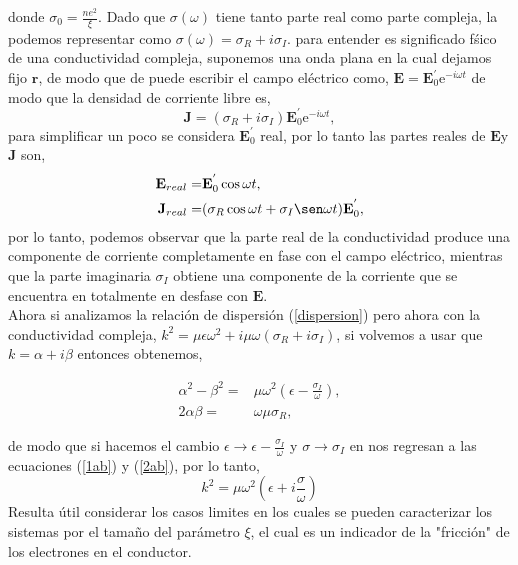 \documentclass[11pt,fleqn]{book} %
\begin{document}
   donde $\sigma_0=\frac{ne^2}{\xi}$. Dado que $\sigma(\omega)$ tiene tanto parte real como parte compleja, la podemos representar como $\sigma(\omega)=\sigma_R+i\sigma_I$. para entender es significado f\'sico de una conductividad compleja, suponemos una onda plana en la cual dejamos fijo $\textbf{r}$, de modo que de puede escribir el campo el\'ectrico como, $\textbf{E}=\textbf{E}_0^{'}\text{e}^{-i\omega t}$ de modo que la densidad de corriente libre es,
   \begin{equation*}
    \textbf{J}=(\sigma_R+i\sigma_I) \textbf{E}_0^{'}\text{e}^{-i\omega t},
    \end{equation*}
    para simplificar un poco se considera $\textbf{E}_0^{'}$ real, por lo tanto las partes reales de $\textbf{E}$y $\textbf{J}$ son,
    \begin{equation}  \label{desfase}
    \begin{split}
    \textbf{E}_{real}=&\textbf{E}_0^{'}\cos \omega t,\\
    \textbf{J}_{real}=&(\sigma_R\cos \omega t+\sigma_I\sen \omega t)\textbf{E}_0^{'},
    \end{split}
    \end{equation}
    por lo tanto, podemos observar que la parte real de la conductividad produce una componente de corriente completamente en fase con el campo el\'ectrico, mientras que la parte imaginaria $\sigma_I$ obtiene una componente de la corriente que se encuentra en totalmente en desfase con $\textbf{E}$.\\
 Ahora si analizamos la relaci\'on de dispersi\'on (\ref{dispersion}) pero ahora con la conductividad compleja, $k^2=\mu\epsilon\omega^2+i\mu\omega(\sigma_R+i\sigma_I)$, si volvemos a usar que $k=\alpha+i\beta$ entonces obtenemos,

    \begin{equation*}
    \begin{split}
	\alpha^2-\beta^2=&\mu\omega^2\left(\epsilon-\frac{\sigma_I}{\omega} \right),\\
	2\alpha\beta=&\omega\mu\sigma_R,
    \end{split}
    \end{equation*}

de modo que si hacemos el cambio $\epsilon\rightarrow\epsilon-\frac{\sigma_I}{\omega}$ y $\sigma\rightarrow\sigma_I$ en nos regresan a las ecuaciones (\ref{1ab}) y (\ref{2ab}), por lo tanto,
\begin{equation}
 k^2=\mu\omega^2\left( \epsilon+i\frac{\sigma}{\omega} \right)
 \end{equation}
 Resulta \'util considerar los casos limites en los cuales se pueden caracterizar los sistemas por el tamaño del par\'ametro $\xi$, el cual es un indicador de la "fricci\'on"  de los electrones en el conductor.\\\\
\end{document}
